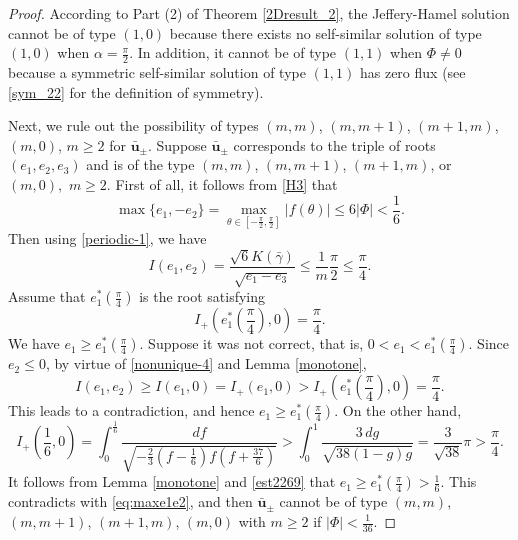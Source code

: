 \documentclass[reqno,12pt]{amsart}
\newcommand{\Bu}{{\boldsymbol{u}}}
\begin{document}
\begin{proof}
According to Part (2) of Theorem \ref{2Dresult_2}, the Jeffery-Hamel solution cannot be of type $(1,0)$ because there exists no self-similar solution of type $(1,0)$ when $\alpha=\frac{\pi}{2}$. In addition, it cannot be of type $(1,1)$ when $\Phi\neq 0$ because a symmetric self-similar solution of type $(1,1)$ has zero flux (see \eqref{sym_22} for the definition of symmetry). 

Next, we rule out the possibility of types $(m, m)$, $(m, m+1)$, $(m+1, m)$, $(m,0)$, $m\geq 2$ for ${\bar{\Bu}}_{\pm}$. 
Suppose ${\bar{\Bu}}_{\pm}$ corresponds to the triple of roots $(e_1, e_2, e_3)$ and is of the type $(m, m)$, $(m, m+1)$, $(m+1, m)$, or $(m,0),$ $m\geq 2$. 
First of all, it follows  from \eqref{H3} that
\begin{equation}\label{eq:maxe1e2}
    \max\{e_1, -e_2\} =  \max_{\theta\in [-\frac{\pi}{2}, \frac{\pi}{2}]} |f(\theta)| \leq 6 |\Phi|<\frac{1}{6}.
\end{equation}
Then using \eqref{periodic-1}, we have 
\begin{equation*}
  I(e_1, e_2) = \frac{\sqrt{6}K( \bar{\gamma})}{\sqrt{e_1 -e_3}} \leq \frac{1}{m} \frac{\pi}{2} \leq \frac{\pi}{4}.
\end{equation*}
Assume that $e_1^*(\frac{\pi}{4})$ is the root satisfying 
\begin{equation*}
    I_{+}\left(e_1^*\left(\frac{\pi}{4}\right), 0\right) = \frac{\pi}{4}. 
\end{equation*}
We have $e_1 \geq e_1^*(\frac{\pi}{4})$. Suppose it was not correct, that is, $0< e_1 < e_1^*(\frac{\pi}{4})$. Since $e_2\leq 0$, by virtue of \eqref{nonunique-4} and  Lemma \ref{monotone}, 
\begin{equation*}
    I(e_1, e_2) \geq I(e_1, 0) =I_{+}(e_1, 0) > I_{+}\left(e_1^*\left(\frac{\pi}{4}\right), 0\right)  = \frac{\pi}{4}.
\end{equation*}
This leads to a contradiction, and hence $e_1 \geq e_1^*(\frac{\pi}{4})$. On the other hand, 
\begin{equation}\label{est2269}
    I_{+}\left(\frac16, 0\right) = \int_0^{\frac16} \frac{df}{\sqrt{-\frac23 (f-\frac16) f (f+ \frac{37}{6})}} > \int_0^1 \frac{3\, dg}{\sqrt{38 (1-g)g }} =\frac{3}{\sqrt{38}}\pi > \frac{\pi}{4}.  
\end{equation}
It follows from Lemma \ref{monotone} and \eqref{est2269} that $e_1 \geq e_1^*(\frac{\pi}{4}) > \frac16$. 
This contradicts with \eqref{eq:maxe1e2}, and then $\bar{\Bu}_{\pm}$ cannot
be of type $(m, m)$, $(m, m+1)$, $(m+1, m)$, $(m,0)$ with $m\geq 2$
if
$|\Phi|< \frac{1}{36}$.  


\end{proof}
\end{document}
